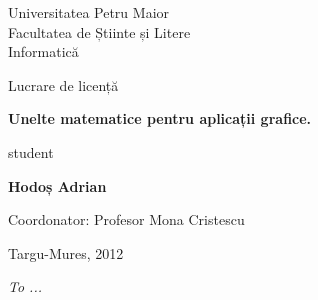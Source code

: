 

\pagestyle{empty}
\sffamily

\noindent
\begin{center}
    \Large
    Universitatea Petru Maior\\
    Facultatea de Știinte și Litere\\
    Informatică
\end{center}

\vfill\vfill
\begin{center}
    \large
    Lucrare de licență\\
\end{center}

\vfill
\begin{center}
    \Huge\bfseries
    Unelte matematice pentru aplicații grafice.
\end{center}

\vfill
\begin{center}
    \Large
    student
\end{center}

\vfill
\begin{center}
    \huge\bfseries
    Hodoș Adrian
\end{center}

\vfill\vfill\vfill
\begin{center}
    \Large
    Coordonator: Profesor Mona Cristescu
\end{center}

\vfill
\begin{center}
\large
    Targu-Mures, 2012
\end{center}

\cleardoublepage

\vspace*{\fill}
{\hfill\sffamily\itshape To ...}
\cleardoublepage

\rmfamily
\normalfont

\pagestyle{headings}
\tableofcontents


